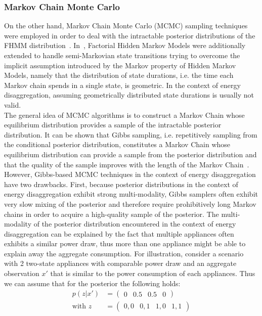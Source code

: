 \documentclass[11pt]{cmuthesis} %
\begin{document}
\subsubsection{Markov Chain Monte Carlo}
On the other hand, Markov Chain Monte Carlo (MCMC) sampling techniques were employed in order to deal with the intractable posterior distributions of the FHMM distribution~\cite{johnson2013bayesian,jia2015fully}. In~\cite{johnson2013bayesian}, Factorial Hidden Markov Models were additionally extended to handle semi-Markovian state transitions trying to overcome the implicit assumption introduced by the Markov property of Hidden Markov Models, namely that the distribution of state durations, i.e. the time each Markov chain spends in a single state, is geometric. In the context of energy disaggregation, assuming geometrically distributed state durations is usually not valid.\\
The general idea of MCMC algorithms is to construct a Markov Chain whose equilibrium distribution provides a sample of the intractable posterior distribution. It can be shown that Gibbs sampling, i.e. repetitively sampling from the conditional posterior distribution, constitutes a Markov Chain whose equilibrium distribution can provide a sample from the posterior distribution and that the quality of the sample improves with the length of the Markov Chain~\cite{geman1987stochastic}. However, Gibbs-based MCMC techniques in the context of energy disaggregation have two drawbacks. First, because posterior distributions in the context of energy disaggregation exhibit strong multi-modality, Gibbs samplers often exhibit very slow mixing of the posterior and therefore require prohibitively long Markov chains in order to acquire a high-quality sample of the posterior. The multi-modality of the posterior distribution encountered in the context of energy disaggregation can be explained by the fact that multiple appliances often exhibits a similar power draw, thus more than one appliance might be able to explain away the aggregate consumption. For illustration, consider a scenario with 2 two-state appliances with comparable power draw and an aggregate observation $x'$ that is similar to the power consumption of each appliances. Thus we can assume that for the posterior the following holds:
\begin{align*}
p(z|x') &= \begin{pmatrix}
0&
0.5&
0.5&
0
\end{pmatrix}\\
 \text{with } z &=\begin{pmatrix} 0,0&
0,1 &
1,0 &
1,1 
\end{pmatrix}
\end{align*}
\end{document}
